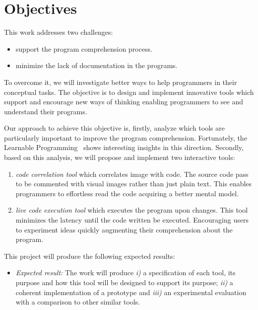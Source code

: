 
% 
% 

\section{Objectives}

This work addresses two challenges:

\begin{itemize}
\item support the program comprehension process.
\item minimize the lack of documentation in the programs.
\end{itemize}

To overcome it, we will investigate better ways to help programmers in their conceptual tasks. The objective is to design and implement innovative tools which support and encourage new ways of thinking enabling programmers to see and understand their programs.

Our approach to achieve this objective is, firstly, analyze which tools are particularly important to improve the program comprehension. Fortunately, the Learnable Programming~\cite{learnableProg,inventingPrin} shows interesting insights in this direction. Secondly, based on this analysis, we will propose and implement two interactive tools: 

\begin{enumerate}
\item \textit{code correlation tool} which correlates image with code. The source code pass to be commented with visual images rather than just plain text. This enables programmers to effortless read the code acquiring a better mental model.
\item \textit{live code execution tool} which executes the program upon changes. This tool minimizes the latency until the code written be executed. Encouraging users to experiment ideas quickly augmenting their comprehension about the program.
\end{enumerate}

This project will produce the following expected results:
 
\begin{itemize}
\item[] \textit{Expected result:} The work will produce \textit{i)} a specification of each tool, its purpose and how this tool will be designed to support its purpose; \textit{ii)} a coherent implementation of a prototype and \textit{iii)} an experimental evaluation with a comparison to other similar tools.
\end{itemize}
